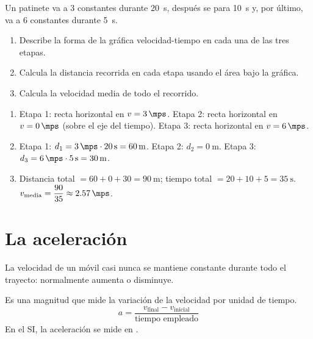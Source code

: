 \begin{exercise}
    Un patinete va a \qty{3}{\mps} constantes durante \qty{20}{\s}, después se para \qty{10}{\s} y, por último, va a \qty{6}{\mps} constantes durante \qty{5}{\s}.
    \begin{enumerate}[label=\letraminuscula]
        \item Describe la forma de la gráfica velocidad-tiempo en cada una de las tres etapas.
        \item Calcula la distancia recorrida en cada etapa usando el área bajo la gráfica.
        \item Calcula la velocidad media de todo el recorrido.
    \end{enumerate}
    \begin{solu}
        \begin{enumerate}[label=\alph*)]
            \item Etapa 1: recta horizontal en \(v=\qty{3}{\mps}\). Etapa 2: recta horizontal en \(v=\qty{0}{\mps}\) (sobre el eje del tiempo). Etapa 3: recta horizontal en \(v=\qty{6}{\mps}\).
            \item Etapa 1: \(d_1 = \qty{3}{\mps} \cdot \qty{20}{\s} = \qty{60}{\m}\). Etapa 2: \(d_2 = \qty{0}{\m}\). Etapa 3: \(d_3 = \qty{6}{\mps} \cdot \qty{5}{\s} = \qty{30}{\m}\).
            \item Distancia total \(= 60 + 0 + 30 = \qty{90}{\m}\); tiempo total \(= 20+10+5 = \qty{35}{\s}\). \\
            \(v_{\text{media}} = \dfrac{90}{35} \approx \qty{2.57}{\mps}\).
        \end{enumerate}
    \end{solu}
\end{exercise}


\section{La aceleración}

La velocidad de un móvil casi nunca se mantiene constante durante todo el trayecto: normalmente aumenta o disminuye.

\begin{definition}[Aceleración]
    Es una magnitud que mide la variación de la velocidad por unidad de tiempo.
    \begin{equation*}
        a = \dfrac{v_{\text{final}} - v_{\text{inicial}}}{\text{tiempo empleado}}
    \end{equation*}
    En el SI, la aceleración se mide en \unit{\mpss}.
\end{definition}

